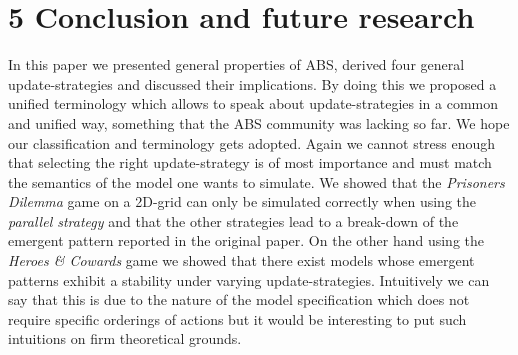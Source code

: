 \section{5 Conclusion and future research}
In this paper we presented general properties of ABS, derived four general update-strategies and discussed their implications. By doing this we proposed a unified terminology which allows to speak about update-strategies in a common and unified way, something that the ABS community was lacking so far. We hope our classification and terminology gets adopted. Again we cannot stress enough that selecting the right update-strategy is of most importance and must match the semantics of the model one wants to simulate.
We showed that the \textit{Prisoners Dilemma} game on a 2D-grid can only be simulated correctly when using the \textit{parallel strategy} and that the other strategies lead to a break-down of the emergent pattern reported in the original paper. On the other hand using the \textit{Heroes \& Cowards} game we showed that there exist models whose emergent patterns exhibit a stability under varying update-strategies. Intuitively we can say that this is due to the nature of the model specification which does not require specific orderings of actions but it would be interesting to put such intuitions on firm theoretical grounds.